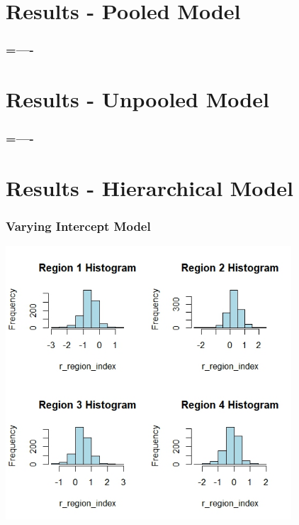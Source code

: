 \documentclass{beamer}
\begin{document}
\section{Results - Pooled Model}

\begin{frame}
\frametitle{=----}

\end{frame}


\section{Results - Unpooled Model}

\begin{frame}
\frametitle{=----}

\end{frame}

\section{Results - Hierarchical Model}

\begin{frame}
\frametitle{Varying Intercept Model}

\begin{center}
    \includegraphics[width=0.8\textwidth]{placeholder_hist_varying_intercept_1_level.jpeg}
\end{center}

\end{frame}
\end{document}
